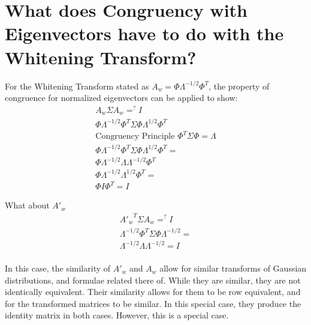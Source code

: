 \documentclass[11pt]{article}
\begin{document}
\section{What does Congruency with Eigenvectors have to do with the Whitening Transform?}
For the Whitening Transform stated as $A_w = \Phi \Lambda^{-1/2}\Phi^T$, the property of congruence for normalized eigenvectors can be applied to show:
\begin{eqnarray}
A_w \Sigma A_w =^? I \\
\Phi \Lambda^{-1/2} \Phi^T  \Sigma \Phi \Lambda ^{1/2} \Phi^T \\
\textrm{Congruency Principle } \Phi^T  \Sigma \Phi = \Lambda \\
\Phi \Lambda^{-1/2} \Phi^T  \Sigma \Phi \Lambda ^{1/2} \Phi^T  = \\
\Phi \Lambda^{-1/2} \Lambda \Lambda ^{-1/2} \Phi^T  \\
\Phi \Lambda^{-1/2} \Lambda ^{1/2} \Phi^T = \\
\Phi I \Phi^T = I 
\end{eqnarray}

What about $A'_w$
\begin{eqnarray}
{A'_w}^T \Sigma A_w =^? I \\
\Lambda^{-1/2} \Phi ^T \Sigma \Phi \Lambda^{-1/2} = \\
\Lambda^{-1/2} \Lambda \Lambda^{-1/2}  = I\\
\end{eqnarray}

In this case, the similarity of $A'_w$ and $A_w$ allow for similar transforms of Gaussian distributions, and formulae related there of.  While they are similar, they are not identically equivalent.  Their similarity allows for them to be row equivalent, and for the transformed matrices to be similar.  In this special case, they produce the identity matrix in both cases.  However, this is a special case.  




\end{document}
